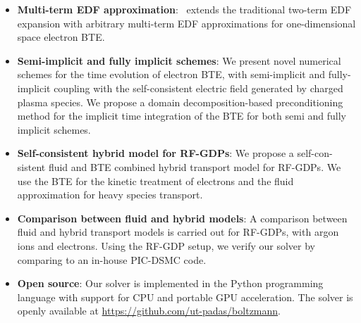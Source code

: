 \begin{itemize}
	\item \textbf{Multi-term EDF approximation}: \bte~extends the traditional two-term EDF expansion with arbitrary multi-term EDF approximations for one-dimensional space electron BTE. 
	\item \textbf{Semi-implicit and fully implicit schemes}: We present novel numerical schemes for the time evolution of electron BTE, with semi-implicit and fully-implicit coupling with the self-consistent electric field generated by charged plasma species. We propose a domain decomposition-based preconditioning method for the implicit time integration of the BTE  for both semi and fully implicit schemes.  
	\item \textbf{Self-consistent hybrid model for RF-GDPs}: We propose a self-con-sistent fluid and BTE combined hybrid transport model for RF-GDPs. We use the BTE for the kinetic treatment of electrons and the fluid approximation for heavy species transport. 
	\item \textbf{Comparison between fluid and hybrid models}: A comparison between fluid and hybrid transport models is carried out for RF-GDPs, with argon ions and electrons. Using the RF-GDP setup, we verify our solver by comparing to an in-house PIC-DSMC code. 
	\item \textbf{Open source}: Our solver is implemented in the Python programming language with support for CPU and portable GPU acceleration. The solver is openly available at \url{https://github.com/ut-padas/boltzmann}. 
\end{itemize}
